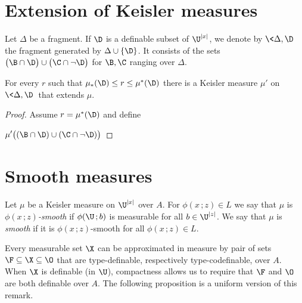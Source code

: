 \documentclass[creche.tex]{subfiles}
\begin{document}
\section{Extension of Keisler measures}

Let $\Delta$ be a fragment. 
If $\D$ is a definable subset of $\U^{|x|}$, we denote by \emph{$\<\Delta,\D\>$\/} the fragment generated by $\Delta\cup\{\D\}$.
It consists of the sets $\big(\B\cap\D\big)\cup\big(\C\cap\neg\D\big)$ for $\B,\C$ ranging over $\Delta$.

\begin{proposition}
For every $r$ such that $\mu_*(\D)\le r\le\mu^*(\D)$ there is a Keisler measure $\mu'$ on $\<\Delta,\D\>$ that extends $\mu$.
\end{proposition}

\begin{proof}
\def\ceq#1#2#3{\parbox[t]{25ex}{$\displaystyle #1$}\medrel{#2}{$\displaystyle #3$}}
Assume $r=\mu^*(\D)$ and define 

\ceq{\hfill\mu'\big((\B\cap\D)\cup(\C\cap\neg\D)\big)}{=}{\mu_*(\B\cap\D)+\cdot\mu^*(\C\cap\neg\D)}


\end{proof}




\section{Smooth measures}

\begin{definition}
Let $\mu$ be a Keisler measure on $\U^{|x|}$ over $A$.
For $\phi(x\,;z)\in L$ we say that $\mu$ is \emph{$\phi(x\,;z)$-smooth\/} if $\phi(\U\,;b)$ is measurable for all $b\in\U^{|z|}$.
We say that $\mu$ is \emph{smooth\/} if it is $\phi(x\,;z)$-smooth for all  $\phi(x\,;z)\in L$.\QED
\end{definition}

Every measurable set $\X$ can be approximated in measure by pair of sets $\F\subseteq\X\subseteq\O$ that are type-definable, respectively type-codefinable, over $A$.
When $\X$ is definable (in $\U$), compactness allows us to require that $\F$ and $\O$ are both definable over $A$.
The following proposition is a uniform version of this remark.
\end{document}
